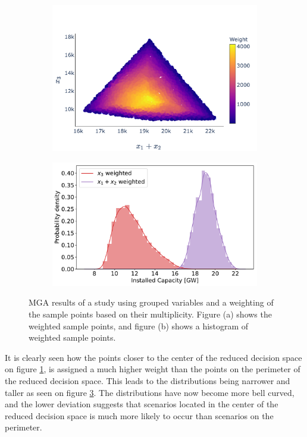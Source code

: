 \begin{figure}[H]\centering
	\begin{subfigure}{.48\textwidth} \centering
		\includegraphics[width=1.\textwidth]{./Images/multi_4}
		\caption{}
		\label{fig:multi_4}
	\end{subfigure}
	\begin{subfigure}{.48\textwidth} \centering
		\includegraphics[width=1.\textwidth]{./Images/multi_5}
		\caption{}
		\label{fig:multi_5}
	\end{subfigure}
	\caption{MGA results of a study using grouped variables and a weighting of the sample points based on their multiplicity. Figure (a) shows the weighted sample points, and figure (b) shows a histogram of weighted sample points.}
\end{figure}

It is clearly seen how the points closer to the center of the reduced decision space on figure \ref{fig:multi_4}, is assigned a much higher weight than the points on the perimeter of the reduced decision space. This leads to the distributions being narrower and taller as seen on figure \ref{fig:multi_5}. The distributions have now become more bell curved, and the lower deviation suggests that scenarios located in the center of the reduced decision space is much more likely to occur than scenarios on the perimeter. 

